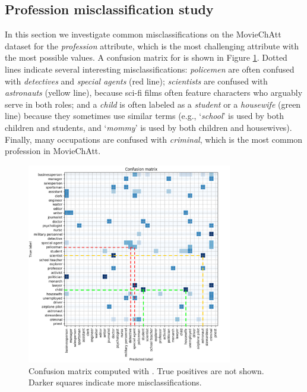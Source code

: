 \subsection{Profession misclassification study}
In this section we investigate common misclassifications on the MovieChAtt dataset for the \textit{profession} attribute, which is the most challenging attribute with the most possible values.
A confusion matrix for  is shown in Figure \ref{matrix}.
Dotted lines indicate several
interesting misclassifications: \textit{policemen} are often confused with \textit{detectives} and \textit{special agents} (red line); \textit{scientists} are confused with \textit{astronauts} (yellow line), because sci-fi films often feature characters who arguably serve in both roles; and a \textit{child} is often labeled as a \textit{student} or a \textit{housewife} (green line) because they sometimes use similar terms (e.g., `\textit{school}' is used by both children and students, and `\textit{mommy}' is used by both children and housewives).
Finally, 
many occupations are confused with \textit{criminal}, which is the most common profession in MovieChAtt.


\begin{figure}[t]
\centering
\includegraphics[width=0.8\textwidth]{ham/pics/conf_new.png}
\vspace*{-0.3cm}
\caption{Confusion matrix computed with . True positives are not shown. Darker squares indicate more misclassifications.}
\label{matrix}
\end{figure}



